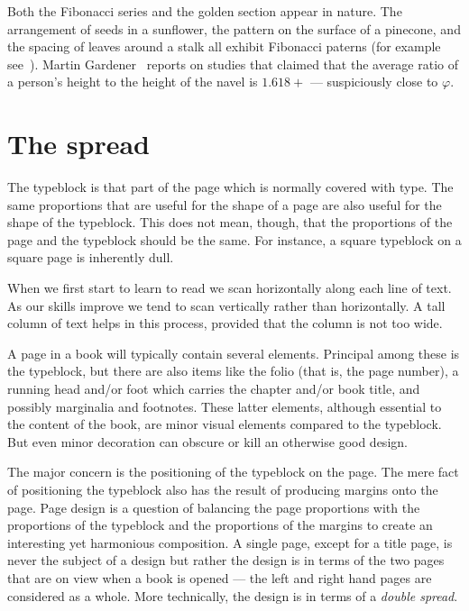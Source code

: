\documentclass[10pt,letterpaper]{memoir}
\begin{document}
    Both the Fibonacci series and the golden section appear in nature.
The arrangement of seeds in a sunflower, the pattern on the surface of a 
pinecone, and the spacing of leaves around a stalk all exhibit Fibonacci
paterns (for example see~\cite{CONWAY96}). Martin Gardener~\cite{GARDNER66}
reports on studies that claimed that the average ratio of a person's height
to the height of the navel is $1.618+$ --- suspiciously close to $\varphi$.



\section{The spread} \label{sec:spread}

    The typeblock is that part of the page which is normally covered with
type. The same proportions that are useful for the shape of a page are also
useful for the shape of the typeblock. This does not mean, though, that the
proportions of the page and the typeblock should be the same. For instance,
a square typeblock on a square page is inherently dull.

    When we first start to learn to read we scan horizontally along each line
of text. As our skills improve we tend to scan vertically rather than
horizontally. A tall column of text helps in this process, provided that
the column is not too wide.

    A page in a book will typically contain several elements. Principal
among these is the typeblock, but there are also items like the folio
(that is, the page number), a running head and/or foot which carries the
chapter and/or book title, and possibly marginalia and footnotes. These latter
elements, although essential to the content of the book, are minor visual
elements compared to the typeblock. But even minor decoration can obscure
or kill an otherwise good design.

  The major concern is the positioning of the typeblock on the page. 
The mere 
fact of positioning the typeblock also has the result of producing margins
onto the page. Page design is a question of balancing the page proportions
with the proportions of the typeblock and the proportions of the margins to 
create an interesting yet harmonious composition. A single page, except
for a title page, is never the subject of a design but rather the design
is in terms of the two pages that are on view when a book is opened --- the
left and right hand pages are considered as a whole. More technically, the
design is in terms of a \emph{double spread}.
\end{document}
